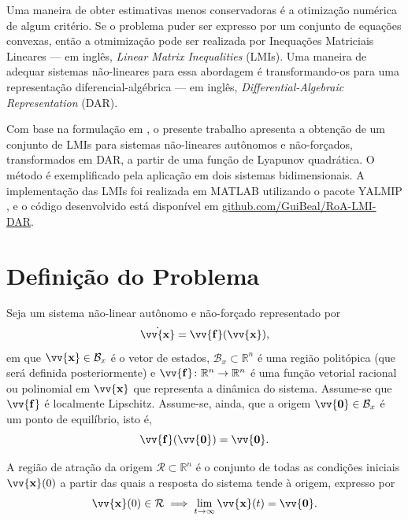 \documentclass{ppgeesa}
\newcommand*{\Bold}[1]{\boldsymbol{\mathbf{#1}}}
\newcommand*{\Vect}[1]{\vv{\Bold{#1}}}
\begin{document}
Uma maneira de obter estimativas menos conservadoras é a otimização numérica de algum critério.
Se o problema puder ser expresso por um conjunto de equações convexas, então a otmimização pode ser realizada por Inequações Matriciais Lineares --- em inglês, \textit{Linear Matrix Inequalities} (LMIs).
Uma maneira de adequar sistemas não-lineares para essa abordagem é transformando-os para uma representação diferencial-algébrica --- em inglês, \textit{Differential-Algebraic Representation} (DAR).

Com base na formulação em \cite{article:Coutinho2010}, o presente trabalho apresenta a obtenção de um conjunto de LMIs para sistemas não-lineares autônomos e não-forçados, transformados em DAR, a partir de uma função de Lyapunov quadrática.
O método é exemplificado pela aplicação em dois sistemas bidimensionais.
A implementação das LMIs foi realizada em MATLAB utilizando o pacote YALMIP \cite{proceedings:Lofberg2004}, e o código desenvolvido está disponível em \href{https://github.com/GuiBeal/RoA-LMI-DAR}{github.com/GuiBeal/RoA-LMI-DAR}.

\section{Definição do Problema}
Seja um sistema não-linear autônomo e não-forçado representado por
\begin{equation}\label{eq:system}
  \dot{\Vect{x}} = \Vect{f}(\Vect{x})
  ,
\end{equation}
em que $\Vect{x} \in \mathcal{B}_x$ é o vetor de estados, $\mathcal{B}_x \subset \mathbb{R}^n$ é uma região politópica (que será definida posteriormente) e $\Vect{f} \colon \mathbb{R}^n \to \mathbb{R}^n$ é uma função vetorial racional ou polinomial em $\Vect{x}$ que representa a dinâmica do sistema.
Assume-se que $\Vect{f}$ é localmente Lipschitz.
Assume-se, ainda, que a origem $\Vect{0} \in \mathcal{B}_x$ é um ponto de equilíbrio, isto é,
\begin{equation}
  \Vect{f}(\Vect{0}) = \Vect{0}
  .
\end{equation}

A região de atração da origem $\mathcal{R} \subset \mathbb{R}^n$ é o conjunto de todas as condições iniciais $\Vect{x}(0)$ a partir das quais a resposta do sistema tende à origem, expresso por
\begin{equation}
  \Vect{x}(0) \in \mathcal{R}
  \implies
  \lim_{t \to \infty} \Vect{x}(t) = \Vect{0}
  .
\end{equation}
\end{document}

